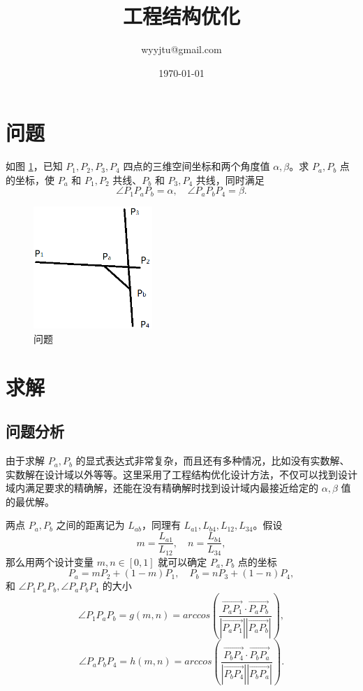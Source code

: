 \documentclass[a4paper]{ctexart}
\title{工程结构优化}
\author{wyyjtu@gmail.com}
\date{\today}
\begin{document}
\maketitle

\section{问题}
如图 \ref{problem}，已知 $P_1, P_2, P_3, P_4$ 四点的三维空间坐标和两个角度值 $\alpha, \beta$。求 $P_a, P_b$ 点的坐标，使 $P_a$ 和 $P_1, P_2$ 共线、$P_b$ 和 $P_3, P_4$ 共线，同时满足
$$\angle P_1P_aP_b = \alpha, \quad \angle P_aP_bP_4 = \beta.$$
\begin{figure}
  \centering
  \includegraphics[width=0.4\textwidth]{problem.png}
  \caption{问题}
  \label{problem}
\end{figure}

\section{求解}
\subsection{问题分析}
由于求解 $P_a, P_b$ 的显式表达式非常复杂，而且还有多种情况，比如没有实数解、实数解在设计域以外等等。这里采用了工程结构优化设计方法，不仅可以找到设计域内满足要求的精确解，还能在没有精确解时找到设计域内最接近给定的 $\alpha, \beta$ 值的最优解。

两点 $P_a, P_b$ 之间的距离记为 $L_{ab}$，同理有 $L_{a1}, L_{b4}, L_{12}, L_{34}$。假设
$$m = \frac{L_{a1}}{L_{12}}, \quad n = \frac{L_{b4}}{L_{34}},$$
那么用两个设计变量 $m, n \in [0, 1]$ 就可以确定 $P_a, P_b$ 点的坐标
$$P_a = mP_2 + (1 - m)P_1, \quad P_b = nP_3 + (1 - n)P_4,$$
和 $\angle P_1P_aP_b, \angle P_aP_bP_4$ 的大小
$$\angle P_1P_aP_b = g(m, n) = arccos\left(\frac{\overrightarrow{P_aP_1} \cdot \overrightarrow{P_aP_b}}{\left|\overrightarrow{P_aP_1}\right| \left|\overrightarrow{P_aP_b}\right|}\right),$$
$$\angle P_aP_bP_4 = h(m, n) = arccos\left(\frac{\overrightarrow{P_bP_4} \cdot \overrightarrow{P_bP_a}}{\left|\overrightarrow{P_bP_4}\right| \left|\overrightarrow{P_bP_a}\right|}\right).$$
\end{document}

